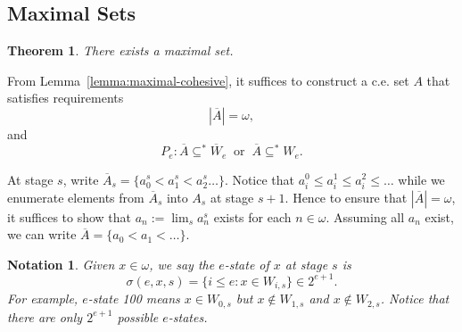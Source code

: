 \documentclass{article}
\newtheorem{notation}{Notation}[subsection]
\newtheorem{definition}{Definition}[subsection]
\newtheorem{theorem}{Theorem}[subsection]
\begin{document}


\subsection{Maximal Sets}
  \begin{theorem}
    There exists a maximal set.
  \end{theorem}

  From Lemma~\ref{lemma:maximal-cohesive}, it suffices to construct a c.e.
  set $A$ that satisfies requirements
  \begin{equation}
    |\overline{A}|=\omega,
    \label{eqn:R}
  \end{equation}
  and
  \begin{equation}
    P_e: \overline{A} \subseteq^*\overline{W}_e\;\; \text{or}\;\;
    \overline{A}\subseteq^* W_e.
    \label{eqn:P_e}
  \end{equation}

  At stage $s$, write $\overline{A}_s =\{a_0^s<a_1^s<a_2^s\ldots\}$. Notice
  that $a_i^0\leq a_i^1\leq a_i^2\leq\ldots$ while we enumerate elements
  from $\overline{A}_s$ into $A_s$ at stage $s+1$. Hence to ensure that
  $|\overline{A}|=\omega$, it suffices to show that $a_n:=\lim_s a_n^s$
  exists for each $n\in\omega$. Assuming all $a_n$ exist, we can write
  $\overline{A}=\{a_0<a_1<\ldots\}$.

  \begin{notation}
    Given $x\in\omega$, we say the $e$-state of $x$ at stage $s$ is
    \[\sigma(e,x,s) =\{i\leq e: x\in W_{i,s}\} \in 2^{e+1}.\]
    For example, $e$-state 100 means $x\in W_{0,s}$ but $x\not\in
    W_{1,s}$ and $x\not\in W_{2,s}$. Notice that there are only $2^{e+1}$
    possible $e$-states.
  \end{notation}
\end{document}
